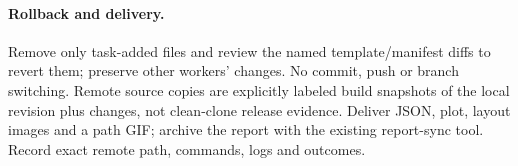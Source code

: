 \documentclass[11pt,a4paper]{article}
\begin{document}
\paragraph{Rollback and delivery.} Remove only task-added files and review the named
template/manifest diffs to revert them; preserve other workers' changes. No commit,
push or branch switching. Remote source copies are explicitly labeled build
snapshots of the local revision plus changes, not clean-clone release evidence.
Deliver JSON, plot, layout images and a path GIF; archive the report with the
existing report-sync tool. Record exact remote path, commands, logs and outcomes.
\begin{center}

\end{center}
\end{document}
